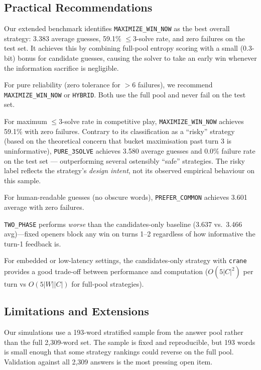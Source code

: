 \documentclass{article}
\begin{document}
\subsection{Practical Recommendations}

Our extended benchmark identifies \texttt{MAXIMIZE\_WIN\_NOW} as the best overall
strategy: 3.383 average guesses, 59.1\% $\leq 3$-solve rate, and zero failures on
the test set. It achieves this by combining full-pool entropy scoring with a small
(0.3-bit) bonus for candidate guesses, causing the solver to take an early win
whenever the information sacrifice is negligible.

For pure reliability (zero tolerance for $>6$ failures), we recommend
\texttt{MAXIMIZE\_WIN\_NOW} or \texttt{HYBRID}. Both use the full pool and never fail
on the test set.

For maximum $\leq 3$-solve rate in competitive play, \texttt{MAXIMIZE\_WIN\_NOW} achieves
59.1\% with zero failures. Contrary to its classification as a ``risky'' strategy
(based on the theoretical concern that bucket maximisation past turn 3 is
uninformative), \texttt{PURE\_3SOLVE} achieves 3.580 average guesses and 0.0\%
failure rate on the test set --- outperforming several ostensibly ``safe''
strategies. The risky label reflects the strategy's \emph{design intent}, not
its observed empirical behaviour on this sample.

For human-readable guesses (no obscure words), \texttt{PREFER\_COMMON} achieves
3.601 average with zero failures.

\texttt{TWO\_PHASE} performs \emph{worse} than the candidates-only baseline
(3.637 vs.\ 3.466 avg)---fixed openers block any win on turns 1--2 regardless
of how informative the turn-1 feedback is.

For embedded or low-latency settings, the candidates-only strategy with
\texttt{crane} provides a good trade-off between performance and computation
($O(5|C|^2)$ per turn vs $O(5|W||C|)$ for full-pool strategies).

\subsection{Limitations and Extensions}
\label{sec:limitations}

Our simulations use a 193-word stratified sample from the answer pool rather than
the full 2,309-word set. The sample is fixed and reproducible, but 193 words is
small enough that some strategy rankings could reverse on the full pool. Validation
against all 2,309 answers is the most pressing open item.
\end{document}
